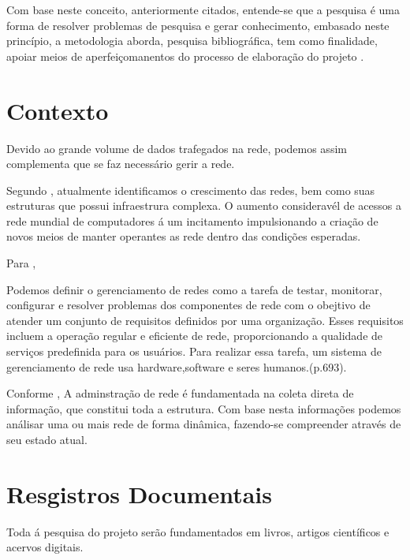 \par Com base neste conceito, anteriormente citados, entende-se que a pesquisa é uma forma
de resolver problemas de pesquisa e gerar conhecimento, embasado neste princípio, a metodologia
aborda, pesquisa bibliográfica, tem como finalidade, apoiar meios de aperfeiçomanentos
do processo de elaboração do projeto .

\section{Contexto}

\par Devido ao grande volume de dados trafegados na rede, podemos assim complementa
que se faz necessário gerir a rede.

\par Segundo , atualmente identificamos o crescimento das redes, bem como
suas estruturas que possui infraestrura complexa. O aumento consideravél de acessos a rede
mundial de computadores á um incitamento impulsionando a criação de novos meios de manter
operantes as rede dentro das condições esperadas.

\par Para ,

\begin{citacao}
	Podemos definir o gerenciamento de redes como a tarefa de testar, monitorar,
	configurar e resolver problemas dos componentes de rede com o obejtivo
	de atender um conjunto de requisitos definidos por uma organização. Esses
	requisitos incluem a operação regular e eficiente de rede, proporcionando a
	qualidade de serviços predefinida para os usuários. Para realizar essa tarefa,
	um sistema de gerenciamento de rede usa hardware,software e seres humanos.(p.693).
\end{citacao}

\par Conforme , A adminstração de rede é fundamentada na coleta direta de
informação, que constitui toda a estrutura. Com base nesta informações podemos análisar uma
ou mais rede de forma dinâmica, fazendo-se compreender através de seu estado atual.


\section{Resgistros Documentais}

\par Toda á pesquisa do projeto serão fundamentados em livros, artigos
científicos e acervos digitais.

